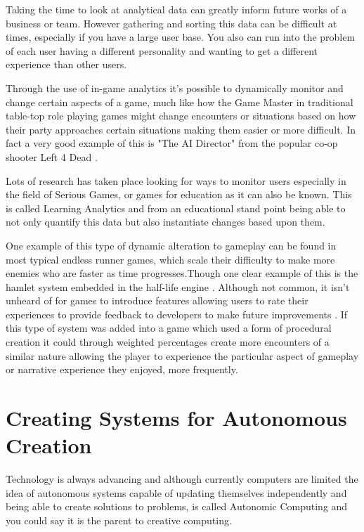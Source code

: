 \documentclass{scrartcl}
\begin{document}
Taking the time to look at analytical data can greatly inform future works of a business or team. However gathering and sorting this data can be difficult at times, especially if you have a large user base. You also can run into the problem of each user having a different personality and wanting to get a different experience than other users.

Through the use of in-game analytics it's possible to dynamically monitor and change certain aspects of a game, much like how the Game Master in traditional table-top role playing games might change encounters or situations based on how their party approaches certain situations making them easier or more difficult. \cite{sega1999house} In fact a very good example of this is "The AI Director" from the popular co-op shooter Left 4 Dead \cite{valve2008left}. 

Lots of research has taken place looking for ways to monitor users especially in the field of Serious Games, or games for education as it can also be known. \cite{shute2009melding} \cite{hauge2014implications} This is called Learning Analytics \cite{fournier2011value} and from an educational stand point being able to not only quantify this data but also instantiate changes based upon them.

One example of this type of dynamic alteration to gameplay can be found in most typical endless runner games, which scale their difficulty to make more enemies who are faster as time progresses.Though one clear example of this is the hamlet system embedded in the half-life engine \cite{hunicke2005case}.  Although not common, it isn't unheard of for games to introduce features allowing users to rate their experiences to provide feedback to developers to make future improvements \cite{ubisoft2013assassins}. If this type of system was added into a game which used a form of procedural creation it could through weighted percentages create more encounters of a similar nature allowing the player to experience the particular aspect of gameplay or narrative experience they enjoyed, more frequently.

\section{Creating Systems for Autonomous Creation}

Technology is always advancing and although currently computers are limited the idea of autonomous systems capable of updating themselves independently and being able to create solutions to problems, is called Autonomic Computing \cite{viroli2016combining} \cite{capodieci2013designing} \cite{krupitzer2015towards} and you could say it is the parent to creative computing. 
\end{document}
